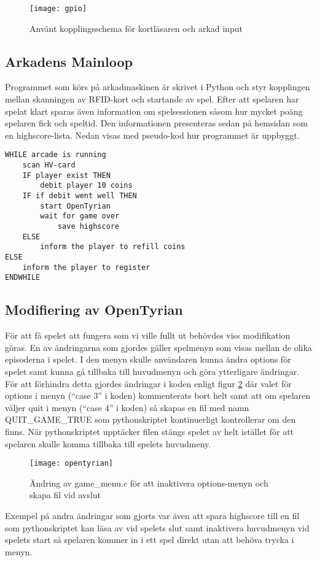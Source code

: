 \documentclass[12pt,fleqn,openany]{book} %
\begin{document}
\begin{figure}[h]
\centering\texttt{[image: gpio]}
\caption{Använt kopplingsschema för kortläsaren och arkad input}
\label{fig_gpio}
\end{figure}

\subsection{Arkadens Mainloop}
Programmet som körs på arkadmaskinen är skrivet i Python och styr kopplingen mellan skanningen av RFID-kort och startande av spel. 
Efter att spelaren har spelat klart sparas även information om spelsessionen såsom hur mycket poäng spelaren fick och speltid. 
Den informationen presenteras sedan på hemsidan som en highscore-lista. Nedan visas med pseudo-kod hur programmet är uppbyggt. 

\begin{verbatim}
WHILE arcade is running
    scan HV-card
    IF player exist THEN
        debit player 10 coins
    IF if debit went well THEN
        start OpenTyrian
        wait for game over
            save highscore
    ELSE
        inform the player to refill coins
ELSE
    inform the player to register
ENDWHILE
\end{verbatim}

\subsection{Modifiering av OpenTyrian}
För att få spelet att fungera som vi ville fullt ut behövdes viss modifikation göras. En av ändringarna som gjordes 
gäller spelmenyn som visas mellan de olika episoderna i spelet. I den menyn skulle användaren kunna ändra options för 
spelet samt kunna gå tillbaka till huvudmenyn och göra ytterligare ändringar. 
För att förhindra detta gjordes ändringar i koden enligt figur \ref{fig_opentyrian} där valet för options i menyn 
(“case 3” i koden) kommenterats bort helt samt att om spelaren väljer quit i menyn (“case 4” i koden) så skapas en 
fil med namn QUIT\_GAME\_TRUE som pythonskriptet kontinuerligt kontrollerar om den finns. När pythonskriptet upptäcker 
filen stängs spelet av helt istället för att spelaren skulle komma tillbaka till spelets huvudmeny.

\begin{figure}[!h]
\centering\texttt{[image: opentyrian]}
\caption{Ändring av game\_menu.c för att inaktivera options-menyn och skapa fil vid avslut}
\label{fig_opentyrian}
\end{figure}
Exempel på andra ändringar som gjorts var även att spara highscore till en fil som pythonskriptet kan läsa av vid 
spelets slut samt inaktivera huvudmenyn vid spelets start så spelaren kommer in i ett spel direkt utan att behöva 
trycka i menyn.
\end{document}
